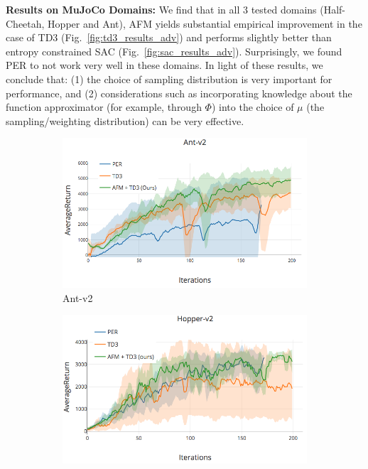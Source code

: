 \textbf{Results on MuJoCo Domains: } We find that in all 3 tested domains (Half-Cheetah, Hopper and Ant), AFM yields substantial empirical improvement in the case of TD3 (Fig.~\ref{fig:td3_results_adv}) and performs slightly better than entropy constrained SAC (Fig.~\ref{fig:sac_results_adv}). Surprisingly, we found PER to not work very well in these domains. In light of these results, we conclude that: (1) the choice of sampling distribution is very  important for performance, and (2) considerations such as incorporating knowledge about the function approximator (for example, through $\Phi$) into the choice of $\mu$ (the sampling/weighting distribution) can be very effective.

\begin{figure}[t]
\begin{subfigure}[t]{0.33\textwidth}
    \includegraphics[scale=0.24]{images/ant_td3_final.png}
    \caption{Ant-v2}
\end{subfigure}
\begin{subfigure}[t]{0.33\textwidth}
    \includegraphics[scale=0.24]{images/hopper_td3_final.png}

\end{subfigure}
\end{figure}
